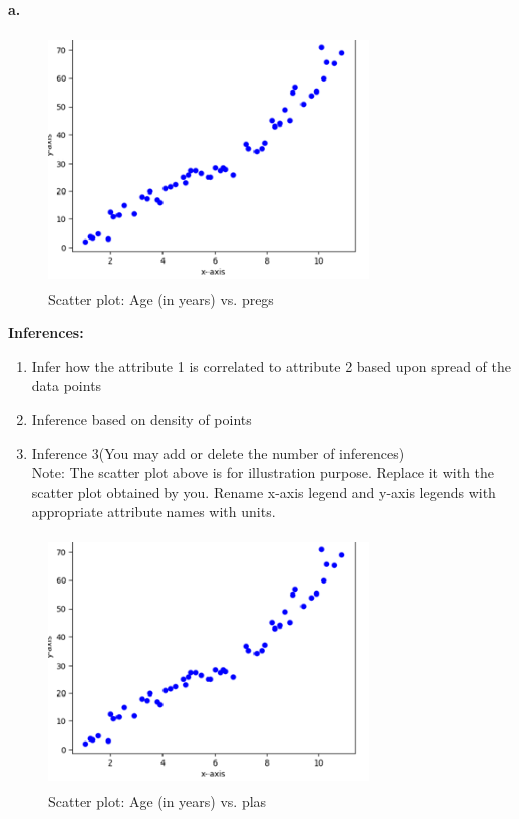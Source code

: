 \documentclass[12 pt, a4paper]{article}
\theoremstyle{definition}
\begin{document}
\section{}
\textbf{a.}
\begin{figure}[H]
	\centering
	\includegraphics[width=8.5cm,height=6.65cm]{Scatter Plot.png}
	\caption{Scatter plot: Age (in years) vs. pregs}
	\label{Blockdia}
\end{figure}

\textbf{\Large Inferences:}
\begin{enumerate}
   \item Infer how the attribute 1 is correlated to attribute 2 based upon spread of the data points
   \item Inference based on density of points
   \item Inference 3(You may add or delete the number of inferences)
\\Note: The scatter plot above is for illustration purpose. Replace it with the scatter plot obtained by you. Rename x-axis legend and y-axis legends with appropriate attribute names with units.

\end{enumerate}

\begin{figure}[H]
	\centering
	\includegraphics[width=8.5cm,height=6.65cm]{Scatter Plot.png}
	\caption{Scatter plot: Age (in years) vs. plas}
	\label{Blockdia}
\end{figure}
\end{document}
